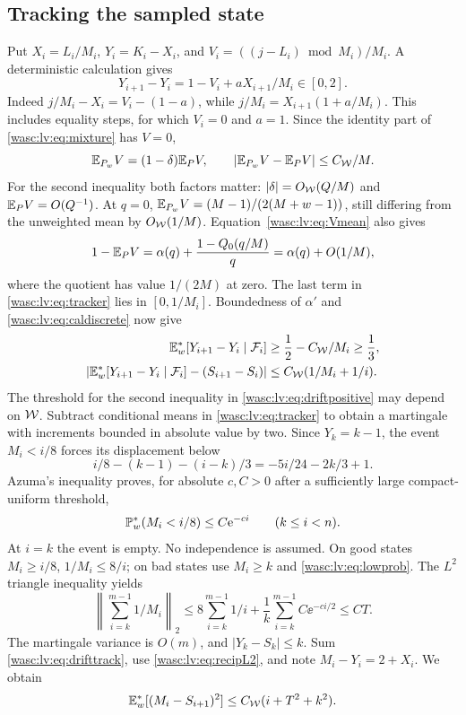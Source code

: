 \documentclass[11pt,a4paper]{article}
\theoremstyle{remark}\newtheorem{remark}[theorem]{Remark}
\numberwithin{equation}{section}
\begin{document}
\subsection{Tracking the sampled state}
Put $X_i=L_i/M_i$, $Y_i=K_i-X_i$, and
$V_i=((j-L_i)\bmod M_i)/M_i$. A deterministic calculation gives
\begin{equation}\label{wasc:lv:eq:tracker}
Y_{i+1}-Y_i=1-V_i+aX_{i+1}/M_i\in[0,2].
\end{equation}
Indeed $j/M_i-X_i=V_i-(1-a)$, while $j/M_i=X_{i+1}(1+a/M_i)$.
This includes equality steps, for which $V_i=0$ and $a=1$.
Since the identity part of \eqref{wasc:lv:eq:mixture} has $V=0$,
\begin{equation}\label{wasc:lv:eq:driftperturb}
\mathbb E_{P_w}V=(1-\delta)\mathbb E_PV,\qquad
|\mathbb E_{P_w}V-\mathbb E_PV|\le C_{\mathcal W}/M.
\end{equation}
For the second inequality both factors matter: $|\delta|=O_{\mathcal W}(Q/M)$ and
$\mathbb E_PV=O(Q^{-1})$. At $q=0$,
$\mathbb E_{P_w}V=(M-1)/(2(M+w-1))$, still differing from the unweighted mean by $O_{\mathcal W}(1/M)$.
Equation~\eqref{wasc:lv:eq:Vmean} also gives
\begin{equation}\label{wasc:lv:eq:ordinarydrift}
1-\mathbb E_PV=\alpha(q)+\frac{1-Q_0(q/M)}q=\alpha(q)+O(1/M),
\end{equation}
where the quotient has value $1/(2M)$ at zero. The last term in \eqref{wasc:lv:eq:tracker} lies in $[0,1/M_i]$. Boundedness of $\alpha'$ and \eqref{wasc:lv:eq:caldiscrete} now give
\begin{align}
\mathbb E_w^*[Y_{i+1}-Y_i\mid\mathcal F_i]&\ge\frac12-C_{\mathcal W}/M_i\ge\frac13,
\label{wasc:lv:eq:driftpositive}\\
\left|\mathbb E_w^*[Y_{i+1}-Y_i\mid\mathcal F_i]-(S_{i+1}-S_i)\right|
&\le C_{\mathcal W}(1/M_i+1/i).\label{wasc:lv:eq:drifttrack}
\end{align}
The threshold for the second inequality in \eqref{wasc:lv:eq:driftpositive} may depend on $\mathcal W$.
Subtract conditional means in \eqref{wasc:lv:eq:tracker} to obtain a martingale with increments bounded in absolute value by two. Since $Y_k=k-1$, the event $M_i<i/8$ forces its displacement below
\[
i/8-(k-1)-(i-k)/3=-5i/24-2k/3+1.
\]
Azuma's inequality proves, for absolute $c,C>0$ after a sufficiently large compact-uniform threshold,
\begin{equation}\label{wasc:lv:eq:lowprob}
\mathbb P_w^*(M_i<i/8)\le C\mathrm e^{-ci}\qquad(k\le i<n).
\end{equation}
At $i=k$ the event is empty. No independence is assumed.
On good states $M_i\ge i/8$, $1/M_i\le8/i$; on bad states use $M_i\ge k$ and \eqref{wasc:lv:eq:lowprob}. The $L^2$ triangle inequality yields
\begin{equation}\label{wasc:lv:eq:recipL2}
\left\|\sum_{i=k}^{m-1}1/M_i\right\|_2
\le8\sum_{i=k}^{m-1}1/i+\frac1k\sum_{i=k}^{m-1}C\ee^{-ci/2}
\le CT.
\end{equation}
The martingale variance is $O(m)$, and $|Y_k-S_k|\le k$. Sum \eqref{wasc:lv:eq:drifttrack}, use \eqref{wasc:lv:eq:recipL2}, and note $M_i-Y_i=2+X_i$. We obtain
\begin{equation}\label{wasc:lv:eq:trackingL2}
\mathbb E_w^*[(M_i-S_{i+1})^2]\le C_{\mathcal W}(i+T^2+k^2).
\end{equation}
\end{document}
